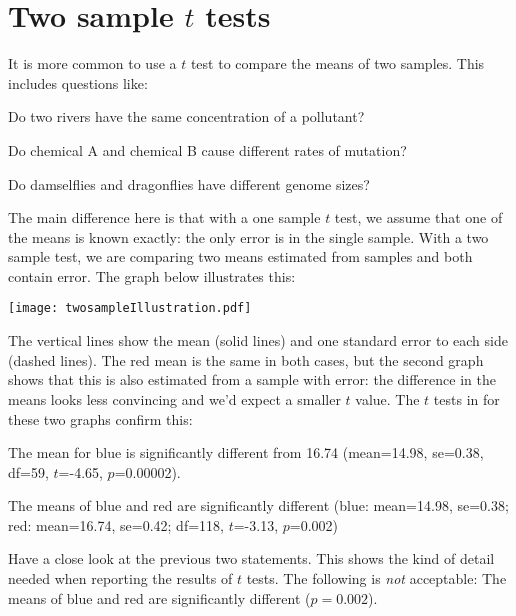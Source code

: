 \section{Two sample $t$ tests}

It is more common to use a $t$ test to compare the means of two 
samples. This includes questions like:

\begin{compactitem}
	\item Do two rivers have the same concentration of a pollutant?
	\item Do chemical A and chemical B cause different rates of mutation?
	\item Do damselflies and dragonflies have different genome sizes?
\end{compactitem}

The main difference here is that with a one sample $t$ test, we assume 
that one of the means is known exactly: the only error is in the single 
sample. With a two sample test, we are comparing two means estimated 
from samples and both contain error. The graph below illustrates this:
\begin{center}
\texttt{[image: twosampleIllustration.pdf]} 
\end{center}
	
The vertical lines show the mean (solid lines) and one standard error 
to each side (dashed lines). The red mean is the same in both cases, 
but the second graph shows that this is also estimated from a sample 
with error: the difference in the means looks less convincing and we'd 
expect a smaller $t$ value. The $t$ tests in for these two graphs 
confirm this:

\begin{compactitem}
\item The mean for blue is significantly different from 16.74 
(mean=14.98, se=0.38, df=59, $t$=-4.65, $p$=0.00002). 
\item The means of blue and red are significantly different (blue: 
mean=14.98, se=0.38; red: mean=16.74, se=0.42; df=118, $t$=-3.13, 
$p$=0.002)
\end{compactitem}

\begin{compactitem}[$\quad\star$]
\item Have a close look at the previous two statements. This shows the 
kind of detail needed when reporting the results of $t$ tests. The 
following is \emph{not} acceptable: The means of blue and red are 
significantly different ($p=0.002$).
\end{compactitem}

